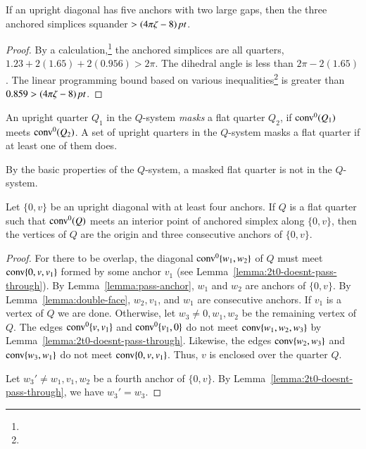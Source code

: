 \begin{lemma}
If an upright diagonal has five anchors with two large
gaps, then the three anchored simplices squander $>(4\pi\zeta-8)\,\hbox{\it pt}$.
\end{lemma}

\begin{proof}
By a calculation,\footnote{} %
the anchored simplices are all quarters,
    $1.23+2(1.65)+2(0.956)>2\pi$.
The dihedral angle is less than $2\pi-2(1.65)$.  The linear programming
bound based on various inequalities\footnote{} %
is greater than $0.859>(4\pi\zeta-8)\,\hbox{\it pt}$.
\end{proof}

\begin{definition}
An upright quarter $Q_1$ in the $Q$-system
{\it masks} a flat quarter $Q_2$, if
${\operatorname{conv}}^0(Q_1)$ meets ${\operatorname{conv}}^0(Q_2)$.   A set of upright
quarters in the $Q$-system masks a flat quarter if at least 
one of them does.
\end{definition}

By the basic properties of the $Q$-system, a masked flat quarter is
not in the $Q$-system.

\begin{lemma}
Let $\{0,v\}$ be an upright diagonal with at least four anchors.
If $Q$ is a flat quarter such that ${\operatorname{conv}}^0(Q)$  meets  
an interior point of 
anchored simplex along $\{0,v\}$, then the vertices of $Q$ are the
origin and three consecutive anchors of $\{0,v\}$.
\end{lemma}

\begin{proof}
For there to be overlap, the diagonal ${\operatorname{conv}}^0\{w_1,w_2\}$ of $Q$ 
must meet
 ${\operatorname{conv}}\{0,v,v_1\}$ formed by some anchor $v_1$  (see
Lemma~\ref{lemma:2t0-doesnt-pass-through}).  By
Lemma~\ref{lemma:pass-anchor}, $w_1$ and $w_2$ are anchors of
$\{0,v\}$. By Lemma~\ref{lemma:double-face}, $w_2,v_1$, and $w_1$
are consecutive anchors. If $v_1$ is a vertex of $Q$ we are done.
Otherwise, let $w_3\ne 0,w_1,w_2$ be the remaining vertex of $Q$.
The edges ${\operatorname{conv}}^0\{v,v_1\}$ and ${\operatorname{conv}}^0\{v_1,0\}$ do not
meet
${\operatorname{conv}}\{w_1,w_2,w_3\}$ by Lemma~\ref{lemma:2t0-doesnt-pass-through}.
Likewise, the edges ${\operatorname{conv}}\{w_2,w_3\}$ and ${\operatorname{conv}}\{w_3,w_1\}$ 
do not meet
 ${\operatorname{conv}}\{0,v,v_1\}$. Thus, $v$ is enclosed over the
quarter $Q$.


Let $w_3'\ne w_1,v_1,w_2$ be a fourth anchor of $\{0,v\}$. By
Lemma~\ref{lemma:2t0-doesnt-pass-through}, we have $w_3'=w_3$.
\end{proof}

